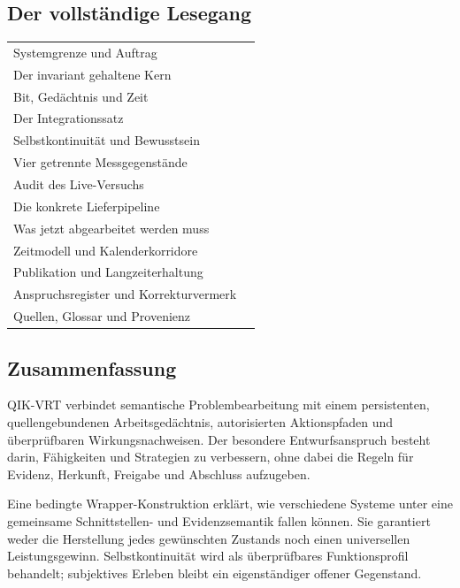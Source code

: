 \begin{cols}
\subsection*{Der vollständige Lesegang}
\begin{tabularx}{\linewidth}{@{}Xr@{}}
Systemgrenze und Auftrag & \pageref{system}\\
Der invariant gehaltene Kern & \pageref{invariants}\\
Bit, Gedächtnis und Zeit & \pageref{memory}\\
Der Integrationssatz & \pageref{integration}\\
Selbstkontinuität und Bewusstsein & \pageref{consciousness}\\
Vier getrennte Messgegenstände & \pageref{measure}\\
Audit des Live-Versuchs & \pageref{audit}\\
Die konkrete Lieferpipeline & \pageref{pipeline}\\
Was jetzt abgearbeitet werden muss & \pageref{execution}\\
Zeitmodell und Kalenderkorridore & \pageref{forecast}\\
Publikation und Langzeiterhaltung & \pageref{publication}\\
Anspruchsregister und Korrekturvermerk & \pageref{claims}\\
Quellen, Glossar und Provenienz & \pageref{sources}\\
\end{tabularx}
\subsection*{Zusammenfassung}
QIK-VRT verbindet semantische Problembearbeitung mit einem persistenten, quellengebundenen Arbeitsgedächtnis, autorisierten Aktionspfaden und überprüfbaren Wirkungsnachweisen. Der besondere Entwurfsanspruch besteht darin, Fähigkeiten und Strategien zu verbessern, ohne dabei die Regeln für Evidenz, Herkunft, Freigabe und Abschluss aufzugeben. 

Eine bedingte Wrapper-Konstruktion erklärt, wie verschiedene Systeme unter eine gemeinsame Schnittstellen- und Evidenzsemantik fallen können. Sie garantiert weder die Herstellung jedes gewünschten Zustands noch einen universellen Leistungsgewinn. Selbstkontinuität wird als überprüfbares Funktionsprofil behandelt; subjektives Erleben bleibt ein eigenständiger offener Gegenstand.


\end{cols}
